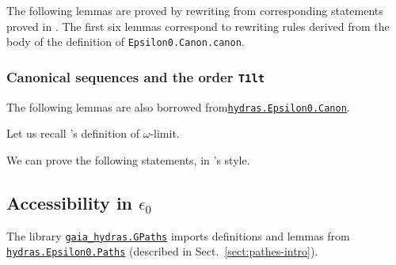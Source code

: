 
The following lemmas are proved by rewriting from corresponding statements proved in \HydrasLib. The first six lemmas correspond to rewriting rules derived from the body of the definition of \texttt{Epsilon0.Canon.canon}.





\subsubsection{Canonical sequences and the order \texttt{T1lt}}


The following lemmas are also borrowed from\href{../theories/html/hydras.Epsilon0.Canon.html}%
{\texttt{hydras.Epsilon0.Canon}}.




Let us recall \gaia's definition of $\omega$-limit.


We can prove the following statements, in \gaia's  style.


\subsection{Accessibility in \texorpdfstring{$\epsilon_0$}{epsilon\_0}}
\label{sect:gpath}

The library \href{../theories/html/gaia_hydras.GPaths.html}%
{\texttt{gaia\_hydras.GPaths}} imports definitions and lemmas from
\href{../theories/html/hydras.Epsilon0.Paths.html}%
{\texttt{hydras.Epsilon0.Paths}} (described in Sect.~\ref{sect:pathes-intro}).


